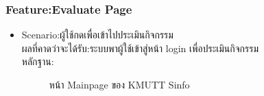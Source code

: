 \documentclass[14pt,oneside,openright,a4paper]{cpe-thai-project}
\begin{document}
\subsubsection{Feature:Evaluate Page}
\begin{itemize}
  \item Scenario:ผู้ใช้กดเพื่อเข้าไปประเมินกิจกรรม\\ผลที่คาดว่าจะได้รับ:ระบบพาผู้ใช้เข้าสู่หน้า login เพื่อประเมินกิจกรรม\\หลักฐาน:\\
  \begin{figure}[!h]\centering
    \setlength{\fboxrule}{0.5mm} %
    \setlength{\fboxsep}{0.5cm}
    \caption{หน้า Mainpage ของ KMUTT Sinfo}\label{fig:sinfo}
  \end{figure}
\end{itemize}
\newpage
\end{document}
